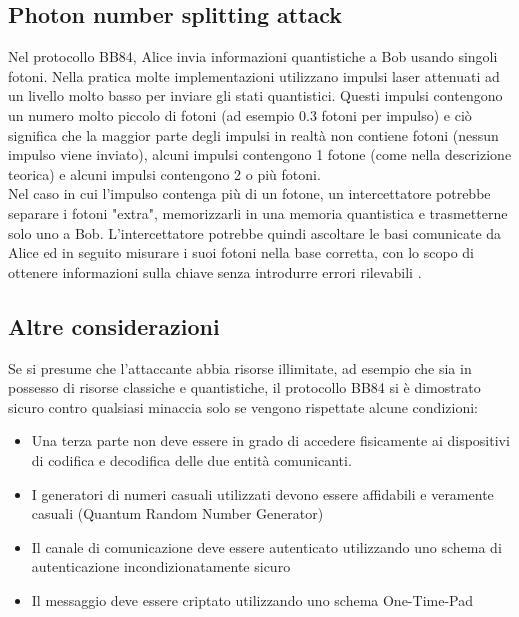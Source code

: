 \subsection{Photon number splitting attack}
Nel protocollo BB84, Alice invia informazioni quantistiche a Bob usando singoli fotoni. Nella pratica molte implementazioni utilizzano impulsi laser attenuati ad un livello molto basso per inviare gli stati quantistici. Questi impulsi contengono un numero molto piccolo di fotoni (ad esempio 0.3 fotoni per impulso) e ciò significa che la maggior parte degli impulsi in realtà non contiene fotoni (nessun impulso viene inviato), alcuni impulsi contengono 1 fotone (come nella descrizione teorica) e alcuni impulsi contengono 2 o più fotoni.\\
Nel caso in cui l'impulso contenga più di un fotone, un intercettatore potrebbe separare i fotoni "extra", memorizzarli in una memoria quantistica e trasmetterne solo uno a Bob. L'intercettatore potrebbe quindi ascoltare le basi comunicate da Alice ed in seguito misurare i suoi fotoni nella base corretta, con lo scopo di ottenere informazioni sulla chiave senza introdurre errori rilevabili \cite{grazioso_photon-number-splitting-attack_2013}.

\subsection{Altre considerazioni}
Se si presume che l'attaccante abbia risorse illimitate, ad esempio che sia in possesso di risorse classiche e quantistiche, il protocollo BB84 si è dimostrato sicuro contro qualsiasi minaccia solo se vengono rispettate alcune condizioni:
\begin{itemize}
    \item Una terza parte non deve essere in grado di accedere fisicamente ai dispositivi di codifica e decodifica delle due entità comunicanti.
    \item I generatori di numeri casuali utilizzati devono essere affidabili e veramente casuali (Quantum Random Number Generator) \cite{herrero-collantes_quantum_2017}
    \item Il canale di comunicazione deve essere autenticato utilizzando uno schema di autenticazione incondizionatamente sicuro
    \item Il messaggio deve essere criptato utilizzando uno schema One-Time-Pad \cite{horstmeyer_physical_2013}
\end{itemize}